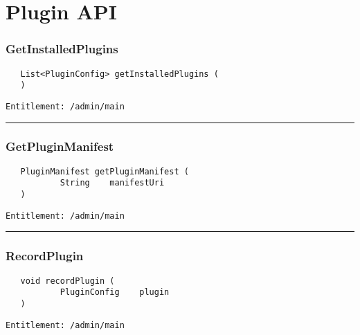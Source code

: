 \chapter{Plugin API}

\subsection{GetInstalledPlugins}
\label{Api:GetInstalledPlugins}
\begin{Verbatim}
   List<PluginConfig> getInstalledPlugins (
   )
\end{Verbatim}
\begin{Verbatim}[formatcom=\color{Maroon}]
  Entitlement: /admin/main
\end{Verbatim}



\rule{12cm}{2pt}
\subsection{GetPluginManifest}
\label{Api:GetPluginManifest}
\begin{Verbatim}
   PluginManifest getPluginManifest (
           String    manifestUri
   )
\end{Verbatim}
\begin{Verbatim}[formatcom=\color{Maroon}]
  Entitlement: /admin/main
\end{Verbatim}



\rule{12cm}{2pt}
\subsection{RecordPlugin}
\label{Api:RecordPlugin}
\begin{Verbatim}
   void recordPlugin (
           PluginConfig    plugin
   )
\end{Verbatim}
\begin{Verbatim}[formatcom=\color{Maroon}]
  Entitlement: /admin/main
\end{Verbatim}



